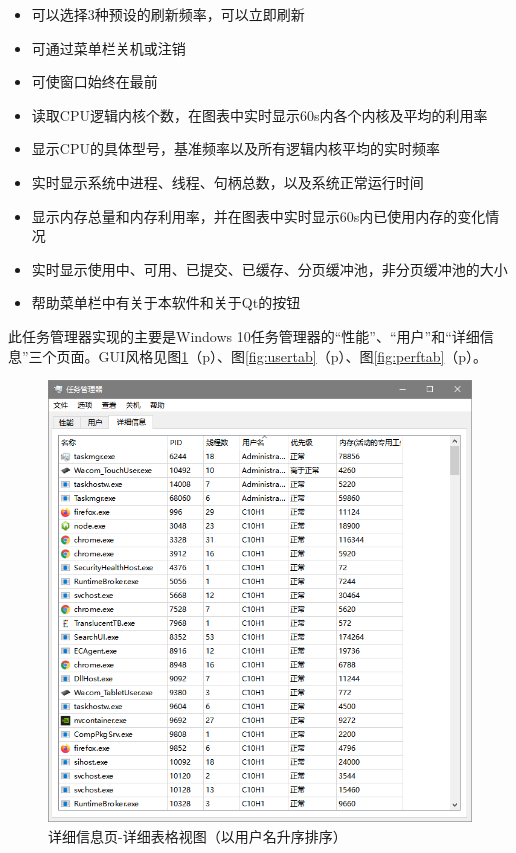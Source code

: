 \documentclass{beamer}
\newcommand\myref[1]{\ref{#1}（p\pageref{#1}）}
\begin{document}
\begin{frame}
    \begin{itemize}
    \item 可以选择3种预设的刷新频率，可以立即刷新
    \item 可通过菜单栏关机或注销
    \item 可使窗口始终在最前
    \item 读取CPU逻辑内核个数，在图表中实时显示60s内各个内核及平均的利用率
    \item 显示CPU的具体型号，基准频率以及所有逻辑内核平均的实时频率
    \item 实时显示系统中进程、线程、句柄总数，以及系统正常运行时间
    \item 显示内存总量和内存利用率，并在图表中实时显示60s内已使用内存的变化情况
    \item 实时显示使用中、可用、已提交、已缓存、分页缓冲池，非分页缓冲池的大小
    \item 帮助菜单栏中有关于本软件和关于Qt的按钮
    \end{itemize}
\end{frame}

\begin{frame}
此任务管理器实现的主要是Windows 10任务管理器的``性能''、``用户''和``详细信息''三个页面。GUI风格见图\myref{fig:detailtab}、图\myref{fig:usertab}、图\myref{fig:perftab}。

\begin{figure}[htb]
    \centering
    \includegraphics[scale=0.35]{../media/tabs/detailTab/listView/listview.png}
    \caption{详细信息页-详细表格视图（以用户名升序排序）}
    \label{fig:detailtab}
\end{figure}
\end{frame}
\end{document}
